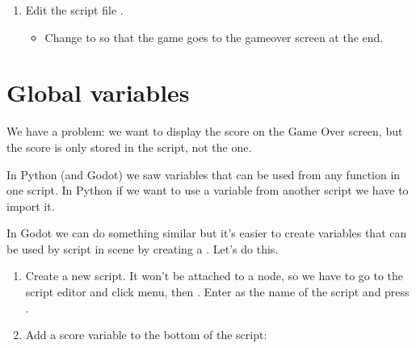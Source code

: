 \documentclass[letterpaper,10pt,english]{sphinxmanual}
\begin{document}
\sphinxAtStartPar
{}
\begin{enumerate}
%
\item {} 
\sphinxAtStartPar
Edit the script file .
\begin{itemize}
\item {} 
\sphinxAtStartPar
Change  to  so that the game goes to the gameover screen at the end.

\end{itemize}

\end{enumerate}


\section{Global variables}
\label{\detokenize{pandoc_tut:global-variables}}
\sphinxAtStartPar
We have a problem: we want to display the score on the Game Over screen, but the score is only
stored in the  script, not the  one.

\sphinxAtStartPar
In Python (and Godot) we saw  variables that can be used from any function in one script.  In Python if we want to use a variable from another script we have to import it.

\sphinxAtStartPar
In Godot we can do something similar but it’s easier to create variables that can be used by  script in  scene by creating a .  Let’s do this.
\begin{enumerate}
%
\item {} 
\sphinxAtStartPar
Create a new script.  It won’t be attached to a node, so we have to go to the script editor
and click  menu, then .
Enter  as the name of the script and press .

\item {} 
\sphinxAtStartPar
Add a score variable to the bottom of the script:

\end{enumerate}
\end{document}
